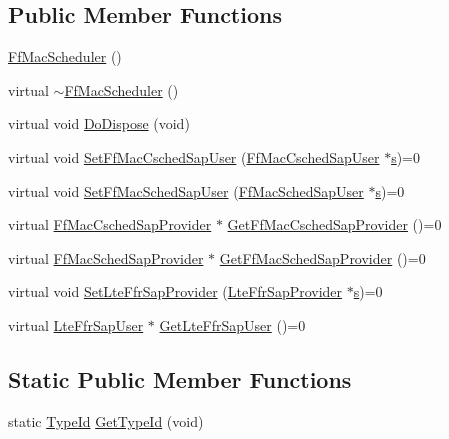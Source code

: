 \subsection*{Public Member Functions}
\begin{DoxyCompactItemize}
\item 
\hyperlink{classns3_1_1FfMacScheduler_aa4c8ce28dbba2c19ff3328533c444045}{Ff\+Mac\+Scheduler} ()
\item 
virtual \hyperlink{classns3_1_1FfMacScheduler_a039a3076c7594f7722ced3586e4e4608}{$\sim$\+Ff\+Mac\+Scheduler} ()
\item 
virtual void \hyperlink{classns3_1_1FfMacScheduler_a771411e455992b81d8399681779debd9}{Do\+Dispose} (void)
\item 
virtual void \hyperlink{classns3_1_1FfMacScheduler_a3984d8478223218fd4432a9f9ead328b}{Set\+Ff\+Mac\+Csched\+Sap\+User} (\hyperlink{classns3_1_1FfMacCschedSapUser}{Ff\+Mac\+Csched\+Sap\+User} $\ast$\hyperlink{generate__test__data__lte__sinr_8m_ad83eeb3a142285d1243a08c6b7026df8}{s})=0
\item 
virtual void \hyperlink{classns3_1_1FfMacScheduler_aa45093350c367b9a33263d5b6eecee34}{Set\+Ff\+Mac\+Sched\+Sap\+User} (\hyperlink{classns3_1_1FfMacSchedSapUser}{Ff\+Mac\+Sched\+Sap\+User} $\ast$\hyperlink{generate__test__data__lte__sinr_8m_ad83eeb3a142285d1243a08c6b7026df8}{s})=0
\item 
virtual \hyperlink{classns3_1_1FfMacCschedSapProvider}{Ff\+Mac\+Csched\+Sap\+Provider} $\ast$ \hyperlink{classns3_1_1FfMacScheduler_a458388c88c892d32e2d7a48883947379}{Get\+Ff\+Mac\+Csched\+Sap\+Provider} ()=0
\item 
virtual \hyperlink{classns3_1_1FfMacSchedSapProvider}{Ff\+Mac\+Sched\+Sap\+Provider} $\ast$ \hyperlink{classns3_1_1FfMacScheduler_ad3a2aca6f1c01fbddf88bfbf19cc07a4}{Get\+Ff\+Mac\+Sched\+Sap\+Provider} ()=0
\item 
virtual void \hyperlink{classns3_1_1FfMacScheduler_a2b3a1635ada88804f035984277371926}{Set\+Lte\+Ffr\+Sap\+Provider} (\hyperlink{classns3_1_1LteFfrSapProvider}{Lte\+Ffr\+Sap\+Provider} $\ast$\hyperlink{generate__test__data__lte__sinr_8m_ad83eeb3a142285d1243a08c6b7026df8}{s})=0
\item 
virtual \hyperlink{classns3_1_1LteFfrSapUser}{Lte\+Ffr\+Sap\+User} $\ast$ \hyperlink{classns3_1_1FfMacScheduler_a32fe62051fd6ac175116417df11e6c4e}{Get\+Lte\+Ffr\+Sap\+User} ()=0
\end{DoxyCompactItemize}
\subsection*{Static Public Member Functions}
\begin{DoxyCompactItemize}
\item 
static \hyperlink{classns3_1_1TypeId}{Type\+Id} \hyperlink{classns3_1_1FfMacScheduler_a46748df809bf03d85c463cf9db7db5b0}{Get\+Type\+Id} (void)
\end{DoxyCompactItemize}
